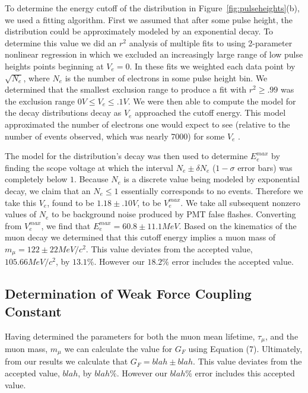 To determine the energy cutoff of the distribution in Figure~\ref{fig:pulseheights}(b), we
used a fitting algorithm.  First we assumed that after some pulse
height, the distribution could be approximately modeled by an
exponential decay.  To determine this value we did an $r^{2}$ analysis
of multiple fits to using 2-parameter nonlinear regression in which we
excluded an increasingly large range of low pulse heights points
beginning at $V_{e}=0$.  In these fits we weighted each data point by
$\sqrt{N_{e}}$, where $N_{e}$ is the number of electrons in some pulse
height bin.  We determined that the smallest exclusion range to
produce a fit with $r^{2}\geq.99$ was the exclusion range $0 V \leq
V_{e}\leq .1 V$.  We were then able to compute the model for the
decay distributions decay as $V_{e}$ approached the cutoff energy.
This model approximated the number of electrons one would expect to
see (relative to the number of events observed, which was nearly 7000)
for some $V_{e}$ .

The model for the distribution's decay was then used to determine
$E_{e}^{max}$ by finding the scope voltage at which the interval
$N_{e}\pm \delta N_{e}$ ($1-\sigma$ error bars) was completely below
$1$.  Because $N_{e}$ is a discrete value being modeled by exponential
decay, we claim that an $N_{e} \leq 1$ essentially corresponds to no
events.  Therefore we take this $V_{e}$, found to be $1.18\pm.10 V$,
to be $V_{e}^{max}$. We take all subsequent nonzero values of $N_{e}$
to be background noise produced by PMT false flashes.  Converting from
$V_{e}^{max}$, we find that $E_{e}^{max}=60.8 \pm 11.1 MeV$.  Based on
the kinematics of the muon decay we determined that this cutoff energy
implies a muon mass of $m_{\mu} = 122 \pm 22 MeV/c^{2}$.  This
value deviates from the accepted value, $105.66 MeV/c^{2}$, by $13.1\%$.
However our $18.2\%$ error includes the accepted value.

\subsection{Determination of Weak Force Coupling Constant}

Having determined the parameters for both the muon mean lifetime, $\tau_{\mu}$, and the muon mass, $m_{\mu}$ we can calculate the value for $G_{F}$ using Equation (7). Ultimately, from our results we calculate that $G_{F}=blah \pm blah$.  This value deviates from the accepted value, $blah$, by $blah\%$. However our $blah\%$ error includes this accepted value.

